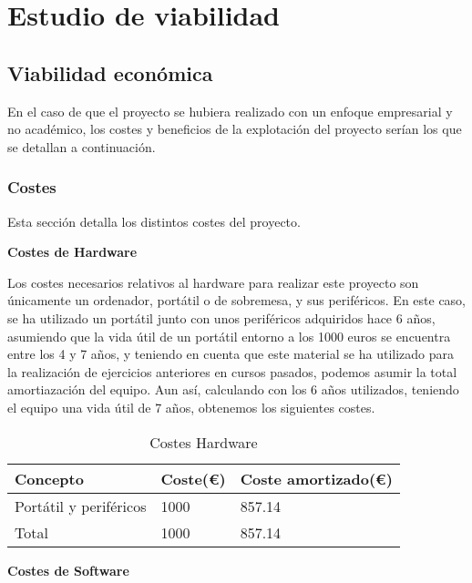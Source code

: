 \section{Estudio de viabilidad}

\subsection{Viabilidad económica}
En el caso de que el proyecto se hubiera realizado con un enfoque empresarial y no académico, los costes y beneficios de la explotación del proyecto serían los que se detallan a continuación.

\subsubsection{Costes}
Esta sección detalla los distintos costes del proyecto.

\textbf{Costes de Hardware}

Los costes necesarios relativos al hardware para realizar este proyecto son únicamente un ordenador, portátil o de sobremesa, y sus periféricos. En este caso, se ha utilizado un portátil junto con unos periféricos adquiridos hace 6 años, asumiendo que la vida útil de un portátil entorno a los 1000 euros se encuentra entre los 4 y 7 años\cite{minitool:vida-util}, y teniendo en cuenta que este material se ha utilizado para la realización de ejercicios anteriores en cursos pasados, podemos asumir la total amortiazación del equipo. Aun así, calculando con los 6 años utilizados, teniendo el equipo una vida útil de 7 años, obtenemos los siguientes costes.
\begin{table}[H]
    \centering
    \begin{tabular}{@{}lll@{}}\toprule
         \textbf{Concepto} & \textbf{Coste(€)} & \textbf{Coste amortizado(€)}  \\ \midrule
         Portátil y periféricos & 1000 & 857.14\\ \midrule
         Total & 1000 & 857.14\\ \bottomrule
    \end{tabular}
    \caption{Costes Hardware}
    \label{ve:cost-hard}
\end{table}

\textbf{Costes de Software}

